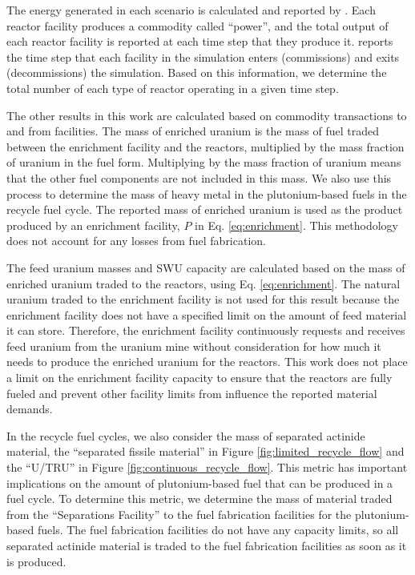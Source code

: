 The energy generated in each scenario is calculated and  
reported by \Cyclus. Each reactor facility produces a 
commodity called ``power'', and the total output of each reactor facility 
is reported at each time step that they produce it. 
\Cyclus reports the time step that each facility in the simulation enters 
(commissions) and exits (decommissions) the simulation. Based on 
this information, we determine the total number of each type of reactor operating 
in a given time step. 

The other results in this work are calculated based on commodity 
transactions to and from facilities. The mass of enriched 
uranium is the mass of fuel traded between the enrichment facility and 
the reactors, multiplied by the mass fraction of uranium in the fuel 
form. Multiplying by the mass fraction of uranium means that the other 
fuel components are not included in this mass. We also use this process 
to determine the mass of heavy metal in the plutonium-based 
fuels in the recycle fuel cycle. The reported mass of enriched uranium is 
used as the product produced by an enrichment facility, $P$ in Eq. 
\ref{eq:enrichment}. This methodology does not account for any 
losses from fuel fabrication. 

The feed uranium masses and \gls{SWU} capacity are calculated 
based on the mass of enriched uranium traded to the reactors, using 
Eq. \ref{eq:enrichment}. The natural uranium traded to the enrichment 
facility is not used for this result because the enrichment facility 
does not have a 
specified limit on the amount of feed material it can store. Therefore, 
the enrichment facility continuously requests and receives feed 
uranium from the uranium mine without consideration for how much it needs 
to produce the enriched uranium for the reactors. This work does not 
place a limit on the enrichment facility capacity to ensure that the 
reactors are fully fueled and prevent other facility limits from 
influence the reported material demands. 

In the recycle fuel cycles, we also consider the mass of separated 
actinide material, the ``separated fissile material'' in Figure 
\ref{fig:limited_recycle_flow} and the ``U/TRU'' in 
Figure \ref{fig:continuous_recycle_flow}. This metric has 
important implications on the 
amount of plutonium-based fuel that can be produced in a fuel 
cycle. To determine this metric, we determine the mass of material 
traded from the ``Separations Facility'' to the fuel fabrication 
facilities for the plutonium-based fuels. The fuel fabrication 
facilities do not have any capacity limits, so all separated 
actinide material is traded to the fuel fabrication facilities 
as soon as it is produced. 

